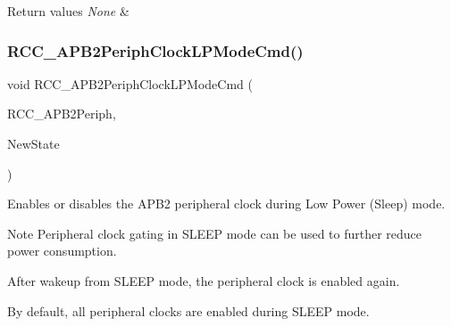 \begin{DoxyRetVals}{Return values}
{\em None} & \\
\hline
\end{DoxyRetVals}
\mbox{\label{group___r_c_c_ga30365b9e0b4c5d7e98c2675c862ddd7e}} 
\subsubsection{\texorpdfstring{R\+C\+C\+\_\+\+A\+P\+B2\+Periph\+Clock\+L\+P\+Mode\+Cmd()}{RCC\_APB2PeriphClockLPModeCmd()}}
{\footnotesize\ttfamily void R\+C\+C\+\_\+\+A\+P\+B2\+Periph\+Clock\+L\+P\+Mode\+Cmd (\begin{DoxyParamCaption}\item[{uint32\+\_\+t}]{R\+C\+C\+\_\+\+A\+P\+B2\+Periph,  }\item[{Functional\+State}]{New\+State }\end{DoxyParamCaption})}



Enables or disables the A\+P\+B2 peripheral clock during Low Power (Sleep) mode. 

\begin{DoxyNote}{Note}
Peripheral clock gating in S\+L\+E\+EP mode can be used to further reduce power consumption. 

After wakeup from S\+L\+E\+EP mode, the peripheral clock is enabled again. 

By default, all peripheral clocks are enabled during S\+L\+E\+EP mode. 
\end{DoxyNote}

